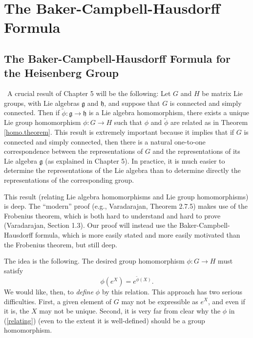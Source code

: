 \documentclass[12pt]{amsbook}
\let \frak = \mathfrak
\theoremstyle{plain}
\numberwithin{equation}{chapter}
\numberwithin{theorem}{chapter}
\begin{document}
\chapter{The Baker-Campbell-Hausdorff Formula}

\section{The Baker-Campbell-Hausdorff Formula for the Heisenberg
Group\label{bch}}

\ A crucial result of Chapter 5 will be the following: Let $G$ and $H$ be
matrix Lie groups, with Lie algebras $\frak{g}$ and $\frak{h}$, and suppose
that $G$ is connected and simply connected. Then if $\widetilde{\phi}%
:\frak{g}\rightarrow\frak{h}$ is a Lie algebra homomorphism, there exists a
unique Lie group homomorphism $\phi:G\rightarrow H$ such that $\phi$ and
$\widetilde{\phi}$ are related as in Theorem \ref{homo.theorem}. This result
is extremely important because it implies that if $G$ is connected and simply
connected, then there is a natural one-to-one correspondence between the
representations of $G$ and the representations of its Lie algebra $\frak{g}$
(as explained in Chapter 5). In practice, it is much easier to determine the
representations of the Lie algebra than to determine directly the
representations of the corresponding group.

This result (relating Lie algebra homomorphisms and Lie group homomorphisms)
is deep. The ``modern'' proof (e.g., Varadarajan, Theorem 2.7.5) makes use of
the Frobenius theorem, which is both hard to understand and hard to prove
(Varadarajan, Section 1.3). Our proof will instead use the
Baker-Campbell-Hausdorff formula, which is more easily stated and more easily
motivated than the Frobenius theorem, but still deep.

The idea is the following. The desired group homomorphism $\phi:G\rightarrow
H$ must satisfy
\begin{equation}
\phi\left(  e^{X}\right)  =e^{\widetilde{\phi}(X)}\text{.}\label{relating}%
\end{equation}
We would like, then, to \textit{define} $\phi$ by this relation. This approach
has two serious difficulties. First, a given element of $G$ may not be
expressible as $e^{X}$, and even if it is, the $X$ may not be unique. Second,
it is very far from clear why the $\phi$ in (\ref{relating}) (even to the
extent it is well-defined) should be a group homomorphism.
\end{document}
